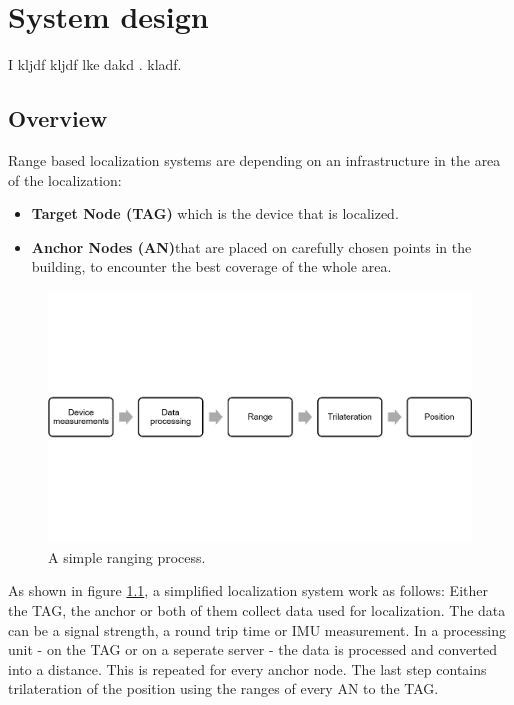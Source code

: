 
\chapter{System design} %

\label{Chapter3} %
I kljdf kljdf lke dakd .
kladf.


\section{Overview}

Range based localization systems are depending on an infrastructure in the area of the localization:
\begin{itemize} 
\item \textbf{Target Node (TAG)} which is the device that is localized. 
\item \textbf{Anchor Nodes (AN)}that are placed on carefully chosen points in the building, to encounter the best coverage of the whole area.
\end{itemize}

\begin{figure}[th]
\centering
\includegraphics[width=1.0\textwidth]{Figures/ranging_process}
\decoRule
\caption[Ranging process]{A simple ranging process.}
\label{fig:ranging_process}
\end{figure}

As shown in figure \ref{fig:ranging_process}, a simplified localization system work as follows:
Either the TAG, the anchor or both of them collect data used for localization. The data can be a signal strength, a round trip time or IMU measurement.
In a processing unit - on the TAG or on a seperate server - the data is processed and converted into a distance. This is repeated for every anchor node.
The last step contains trilateration of the position using the ranges of every AN to the TAG.

